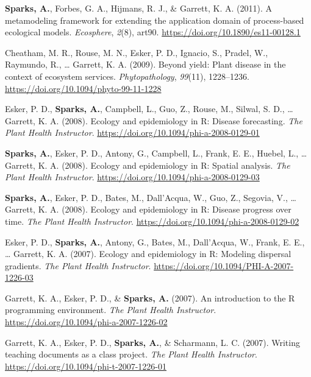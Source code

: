 \documentclass[11pt, a4paper]{awesome-cv}
\begin{document}
\leavevmode\hypertarget{ref-Sparks2011}{}%
\textbf{Sparks, A.}, Forbes, G. A., Hijmans, R. J., \& Garrett, K. A. (2011). A metamodeling framework for extending the application domain of process-based ecological models. \emph{Ecosphere}, \emph{2}(8), art90. \url{https://doi.org/10.1890/es11-00128.1}

\leavevmode\hypertarget{ref-Cheatham2009}{}%
Cheatham, M. R., Rouse, M. N., Esker, P. D., Ignacio, S., Pradel, W., Raymundo, R., \ldots{} Garrett, K. A. (2009). Beyond yield: Plant disease in the context of ecosystem services. \emph{Phytopathology}, \emph{99}(11), 1228--1236. \url{https://doi.org/10.1094/phyto-99-11-1228}

\leavevmode\hypertarget{ref-Esker2008}{}%
Esker, P. D., \textbf{Sparks, A.}, Campbell, L., Guo, Z., Rouse, M., Silwal, S. D., \ldots{} Garrett, K. A. (2008). Ecology and epidemiology in R: Disease forecasting. \emph{The Plant Health Instructor}. \url{https://doi.org/10.1094/phi-a-2008-0129-01}

\leavevmode\hypertarget{ref-Sparks2008a}{}%
\textbf{Sparks, A.}, Esker, P. D., Antony, G., Campbell, L., Frank, E. E., Huebel, L., \ldots{} Garrett, K. A. (2008). Ecology and epidemiology in R: Spatial analysis. \emph{The Plant Health Instructor}. \url{https://doi.org/10.1094/phi-a-2008-0129-03}

\leavevmode\hypertarget{ref-Sparks2008}{}%
\textbf{Sparks, A.}, Esker, P. D., Bates, M., Dall'Acqua, W., Guo, Z., Segovia, V., \ldots{} Garrett, K. A. (2008). Ecology and epidemiology in R: Disease progress over time. \emph{The Plant Health Instructor}. \url{https://doi.org/10.1094/phi-a-2008-0129-02}

\leavevmode\hypertarget{ref-Esker2007}{}%
Esker, P. D., \textbf{Sparks, A.}, Antony, G., Bates, M., Dall'Acqua, W., Frank, E. E., \ldots{} Garrett, K. A. (2007). Ecology and epidemiology in R: Modeling dispersal gradients. \emph{The Plant Health Instructor}. \url{https://doi.org/10.1094/PHI-A-2007-1226-03}

\leavevmode\hypertarget{ref-Garrett2007}{}%
Garrett, K. A., Esker, P. D., \& \textbf{Sparks, A.} (2007). An introduction to the R programming environment. \emph{The Plant Health Instructor}. \url{https://doi.org/10.1094/phi-a-2007-1226-02}

\leavevmode\hypertarget{ref-Garrett2007a}{}%
Garrett, K. A., Esker, P. D., \textbf{Sparks, A.}, \& Scharmann, L. C. (2007). Writing teaching documents as a class project. \emph{The Plant Health Instructor}. \url{https://doi.org/10.1094/phi-t-2007-1226-01}
\end{document}
